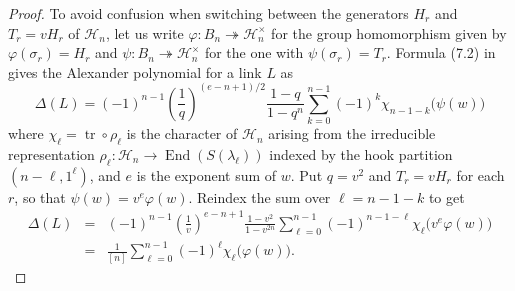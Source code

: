 \documentclass [12pt, letterpaper, oneside] {amsart}
\newcommand \onto {\twoheadrightarrow}
\newcommand \tr {\operatorname {tr}}
\newcommand \End {\operatorname {End}}
\renewcommand \l {\lambda}
\newcommand \s {\sigma}
\newcommand \mc {\mathcal}
\theoremstyle {plain}
\begin{document}
\begin {proof}
To avoid confusion when switching between the generators
$H_r$ and $T_r = vH_r$ of $\mc{H}_n$, let us write
$\varphi: B_n \onto \mc{H}_n^\times$ for the group homomorphism 
given by $\varphi(\s_r) = H_r$ and $\psi: B_n \onto \mc{H}_n^\times$
for the one with $\psi(\s_r) = T_r$.
Formula (7.2) in \cite {Jones} gives the Alexander polynomial for a link $L$ as
\begin{equation}
    \Delta(L) = (-1)^{n-1} \left( \frac 1 q \right)^{(e-n+1)/2} \frac {1-q} {1-q^n} \sum_{k=0}^{n-1} (-1)^k \chi_{n-1-k} \bigl( \psi(w) \bigr)
\end{equation}
where $\chi_\ell = \tr \circ  \rho_{\ell}$ 
is the character of $\mc{H}_n$ arising from the irreducible representation $\rho_\ell: \mc{H}_n \to \End(S(\l_\ell))$ indexed by the hook partition $(n-\ell, 1^\ell)$, and $e$ is the exponent sum of $w$.
Put $q = v^2$ and $T_r=vH_r$ for each $r$, so that $\psi(w) = v^e \varphi(w)$.  Reindex the sum over $\ell = n-1-k$ to get
\begin{eqnarray}
    \Delta(L) &=& (-1)^{n-1} \left( \frac 1 v \right)^{e-n+1} \frac {1-v^2} {1-v^{2n}} \sum_{\ell=0}^{n-1} (-1)^{n-1-\ell} \chi_\ell \bigl( v^e \varphi(w) \bigr) \nonumber \\
    &=&  \frac 1 {[n]} \sum_{\ell=0}^{n-1} (-1)^\ell \chi_\ell \bigl( \varphi(w) \bigr).
\end{eqnarray}


\end{proof}
\end{document}
